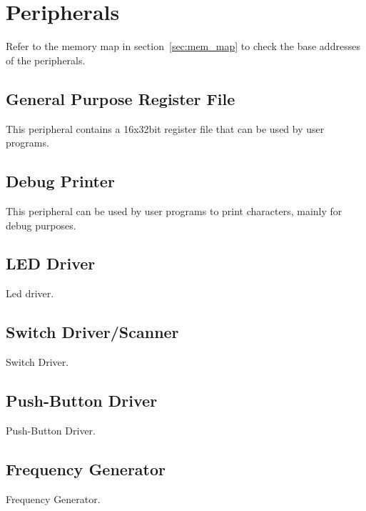 \section{Peripherals}
\label{sec:periphs}



Refer to the memory map in section~\ref{sec:mem_map} to check the base addresses
of the peripherals.

\subsection{General Purpose Register File}

This peripheral contains a 16x32bit register file that can be used by user
programs. 

\subsection{Debug Printer}

This peripheral can be used by user programs to print characters, mainly for
debug purposes.

\subsection{LED Driver}

Led driver.

\subsection{Switch Driver/Scanner}

Switch Driver.

\subsection{Push-Button Driver}

Push-Button Driver.

\subsection{Frequency Generator}

Frequency Generator.

